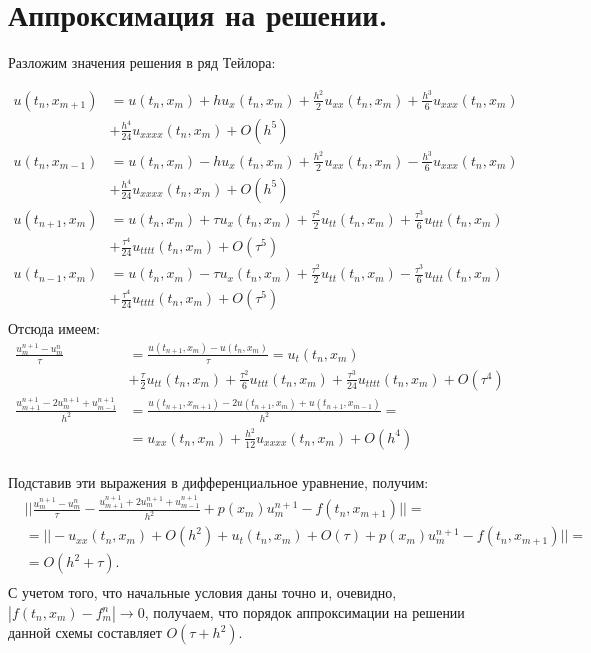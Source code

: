 \documentclass[14pt,a4paper]{extarticle}
\newcommand{\1}{\mathbbm{1}}
\begin{document}
\section{Аппроксимация на решении.}
Разложим значения решения в ряд Тейлора:

\begin{align*}
    u(t_n, x_{m+1}) &= u(t_n, x_{m}) +    h u_x(t_n, x_{m}) 
    + \frac{h^2}{2}u_{xx}(t_n, x_{m}) +    \frac{h^3}{6}u_{xxx}(t_n, x_{m}) \\ &+    \frac{h^4}{24}u_{xxxx}(t_n, x_{m}) + O(h^5) \\
    u(t_n, x_{m-1}) &= u(t_n, x_{m}) -    h u_x(t_n, x_{m}) 
    + \frac{h^2}{2}u_{xx}(t_n, x_{m}) -    \frac{h^3}{6}u_{xxx}(t_n, x_{m}) \\ &+    \frac{h^4}{24}u_{xxxx}(t_n, x_{m}) + O(h^5) \\
    u(t_{n+1}, x_m) &= u(t_{n}, x_m)+ \tau u_x(t_{n}, x_m) + \frac{\tau^2}{2}u_{tt}(t_n, x_{m}) + \frac{\tau^3}{6}u_{ttt}(t_n, x_{m}) \\
    &+ \frac{\tau^4}{24}u_{tttt}(t_n, x_{m}) + O(\tau^5) \\
    u(t_{n-1}, x_m) &= u(t_{n}, x_m)- \tau u_x(t_{n}, x_m) + \frac{\tau^2}{2}u_{tt}(t_n, x_{m}) - \frac{\tau^3}{6}u_{ttt}(t_n, x_{m}) \\
    &+ \frac{\tau^4}{24}u_{tttt}(t_n, x_{m}) + O(\tau^5) \\
\end{align*}
Отсюда имеем:
\begin{align*}
    \frac{u_m^{n+1} - u_m^n}{\tau} &=   \frac{u(t_{n+1}, x_m) - u(t_n, x_m)}{\tau} = u_t(t_{n}, x_m) \\
    &+\frac{\tau}{2}u_{tt}(t_n, x_{m}) + \frac{\tau^2}{6}u_{ttt}(t_n, x_{m}) + \frac{\tau^3}{24}u_{tttt}(t_n, x_{m}) + O(\tau^4) \\
    \frac{u_{m+1}^{n+1} - 2 u_{m}^{n+1} + u_{m-1}^{n+1}}{h^2} &= \frac{u(t_{n+1}, x_{m+1}) - 2 u(t_{n+1}, x_{m}) + u(t_{n+1}, x_{m-1})}{h^2} = \\
    &= u_{xx}(t_n, x_{m}) + \frac{h^2}{12}u_{xxxx}(t_n, x_{m}) + O(h^4)\\
\end{align*}

Подставив эти выражения в дифференциальное уравнение, получим:
\begin{align*}
    &||\frac{u_m^{n+1} - u_m^n}{\tau} - \frac{u_{m+1}^{n+1} + 2 u_{m}^{n+1} + u_{m-1}^{n+1}}{h^2} + p(x_m) u_m^{n+1} - f(t_{n}, x_{m+1})|| = \\
    &= ||- u_{xx}(t_n, x_{m}) + O(h^2) + u_t(t_{n}, x_m) + O(\tau) + p(x_m) u_m^{n+1} - f(t_{n}, x_{m+1}) || =\\
    &= O(h^2 + \tau). \\
\end{align*}
С учетом того, что начальные условия даны точно и, очевидно, $|f(t_n, x_m) - f_m^n| \rightarrow 0$, получаем, что порядок аппроксимации на решении 
данной схемы составляет $O(\tau + h^2)$.
\end{document}

